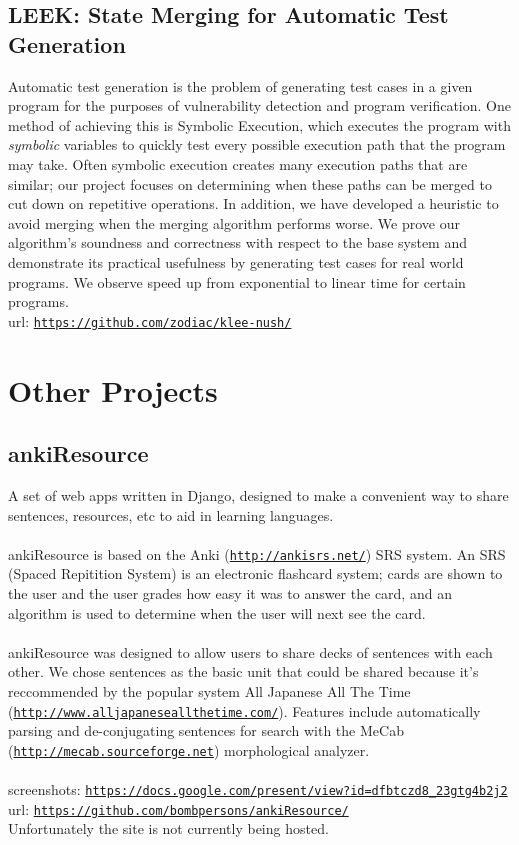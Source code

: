 \documentclass[letterpaper]{article}
\begin{document}
  \subsection*{LEEK: State Merging for Automatic Test Generation}
  Automatic test generation is the problem of generating test cases in a given program for the purposes of vulnerability detection and program verification. One method of achieving this is Symbolic Execution, which executes the program with \emph{symbolic} variables to quickly test every possible execution path that the program may take. Often symbolic execution creates many execution paths that are similar; our project focuses on determining when these paths can be merged to cut down on repetitive operations. In addition, we have developed a heuristic to avoid merging when the merging algorithm performs worse. We prove our algorithm's soundness and correctness with respect to the base system and demonstrate its practical usefulness by generating test cases for real world programs. We observe speed up from exponential to linear time for certain programs.
  \\
    url:
    \href{https://github.com/zodiac/klee-nush}{\tt https://github.com/zodiac/klee-nush/}


    \section*{Other Projects}

    \subsection*{ankiResource}
  A set of web apps written in Django, designed to make a convenient way to share sentences, resources, etc to aid in learning languages.
  \\
  \\
  ankiResource is based on the Anki (\href{http://ankisrs.net/}{\tt http://ankisrs.net/}) SRS system. An SRS (Spaced Repitition System) is an electronic flashcard system; cards are shown to the user and the user grades how easy it was to answer the card, and an algorithm is used to determine when the user will next see the card.
  \\
  \\
  ankiResource was designed to allow users to share decks of sentences with each other. We chose sentences as the basic unit that could be shared because it's reccommended by the popular system All Japanese All The Time (\href{http://www.alljapaneseallthetime.com/}{\tt http://www.alljapaneseallthetime.com/}).  Features include automatically parsing and de-conjugating sentences for search with the MeCab (\href{http://mecab.sourceforge.net/}{\tt http://mecab.sourceforge.net}) morphological analyzer.
  \\
  \\
  screenshots: \href{https://docs.google.com/present/view?id=dfbtczd8\_23gtg4b2j2}{\tt https://docs.google.com/present/view?id=dfbtczd8\_23gtg4b2j2}
\\
  url: \href{https://github.com/bombpersons/ankiResource}{\tt https://github.com/bombpersons/ankiResource/}
  \\
  Unfortunately the site is not currently being hosted.
\end{document}
